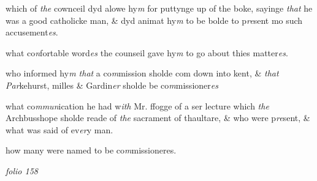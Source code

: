 \documentclass[12pt, a4paper]{book}
\begin{document}
			

		\ifthenelse{\isodd{\thepage}}
		{\reversemarginpar}
		{\normalmarginpar}
		 which of \textit{the} cownceil dyd alowe hy\textit{m} for puttynge up
 of the boke, sayinge \textit{that} he was a good catholicke man,
 \& dyd animat hy\textit{m} to be bolde to p\textit{re}sent mo such
 accusement\textit{es}.
 



			

		\ifthenelse{\isodd{\thepage}}
		{\reversemarginpar}
		{\normalmarginpar}
		 what co\textit{n}fortable word\textit{es} the counseil gave hy\textit{m} to go about
 thies matter\textit{es}.
 



			

		\ifthenelse{\isodd{\thepage}}
		{\reversemarginpar}
		{\normalmarginpar}
		 who informed hy\textit{m that} a co\textit{m}mission sholde com down into
 kent, \& \textit{that}
	\textit{Par}kehurst, milles \& Gardin\textit{er} sholde be co\textit{m}missioner\textit{es}
 



			
	
		\ifthenelse{\isodd{\thepage}}
		{\reversemarginpar}
		{\normalmarginpar}
		 what co\textit{mmun}ication he had w\textit{ith} Mr. ffogge of a ser lecture which
 \textit{the} Archbusshope sholde reade of \textit{the} sacrament of thaultare,
 \& who were p\textit{re}sent, \& what was said of ev\textit{er}y man.
 



				\marginpar[\vspace{0.5cm}{\textcolor{Gray}{11}}]{}
			

		\ifthenelse{\isodd{\thepage}}
		{\reversemarginpar}
		{\normalmarginpar}
		 how many were named to be co\textit{m}missioneres.

\dotfill
						\newpage
{}

\textit{folio 158}

         \vspace*{4cm}
         
\dotfill
						
\end{document}
